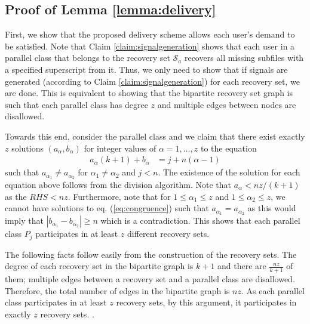 \documentclass[journal,twocolumn]{IEEEtran}
\theoremstyle{definition}
\newcommand{\calP}{\mathcal{P}}
\newcommand{\calS}{\mathcal{S}}
\newcommand{\litang}[1]{\marginpar{+}{\bf Li's remark}: {\em #1}}
\begin{document}
\subsection*{Proof of Lemma \ref{lemma:delivery}}
First, we show that the proposed delivery scheme allows each user's demand to be satisfied. Note that Claim \ref{claim:signalgeneration} shows that each user in a parallel class that belongs to the recovery set $\calS_a$ recovers all missing subfiles with a specified superscript from it. Thus, we only need to show that if signals are generated (according to Claim \ref{claim:signalgeneration}) for each recovery set, we are done. This is equivalent to showing that the bipartite recovery set graph is such that each parallel class has degree $z$ and multiple edges between nodes are disallowed.


Towards this end, consider the parallel class and we claim that there exist exactly $z$ solutions $(a_\alpha, b_\alpha)$ for integer values of $\alpha=1, \dots, z$ to the equation
\begin{align}
a_\alpha (k+1) + b_\alpha &= j + n(\alpha-1) \label{eq:congruence}
\end{align}
such that $a_{\alpha_1} \neq a_{\alpha_2}$ for $\alpha_1 \neq \alpha_2$ and $j < n$.
The existence of the solution for each equation above follows from the division algorithm. Note that $a_\alpha < nz/(k+1)$ as the $RHS < nz$. Furthermore, note that for $1 \leq \alpha_1 \leq z$ and $1 \leq \alpha_2 \leq z$, we cannot have solutions to eq. (\ref{eq:congruence}) such that $a_{\alpha_1} = a_{\alpha_2}$ as this would imply that $ |b_{\alpha_1} - b_{\alpha_2}| \geq n$ which is a contradiction.
This shows that each parallel class $P_j$ participates in at least $z$ different recovery sets.

The following facts follow easily from the construction of the recovery sets. The degree of each recovery set in the bipartite graph is $k+1$ and there are $\frac{nz}{k+1}$ of them; multiple edges between a recovery set and a parallel class are disallowed. Therefore, the total number of edges in the bipartite graph is $nz$. As each parallel class participates in at least $z$ recovery sets, by this argument, it participates in exactly $z$ recovery sets.
.
\end{document}

